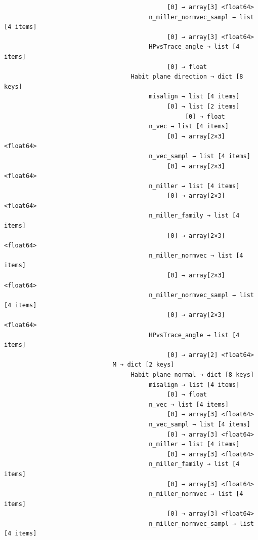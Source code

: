 \documentclass[a4paper,10pt]{article}
\begin{document}
\begin{verbatim}
                                             [0] → array[3] <float64>
                                        n_miller_normvec_sampl → list [4 items]
                                             [0] → array[3] <float64>
                                        HPvsTrace_angle → list [4 items]
                                             [0] → float
                                   Habit plane direction → dict [8 keys]
                                        misalign → list [4 items]
                                             [0] → list [2 items]
                                                  [0] → float
                                        n_vec → list [4 items]
                                             [0] → array[2×3] <float64>
                                        n_vec_sampl → list [4 items]
                                             [0] → array[2×3] <float64>
                                        n_miller → list [4 items]
                                             [0] → array[2×3] <float64>
                                        n_miller_family → list [4 items]
                                             [0] → array[2×3] <float64>
                                        n_miller_normvec → list [4 items]
                                             [0] → array[2×3] <float64>
                                        n_miller_normvec_sampl → list [4 items]
                                             [0] → array[2×3] <float64>
                                        HPvsTrace_angle → list [4 items]
                                             [0] → array[2] <float64>
                              M → dict [2 keys]
                                   Habit plane normal → dict [8 keys]
                                        misalign → list [4 items]
                                             [0] → float
                                        n_vec → list [4 items]
                                             [0] → array[3] <float64>
                                        n_vec_sampl → list [4 items]
                                             [0] → array[3] <float64>
                                        n_miller → list [4 items]
                                             [0] → array[3] <float64>
                                        n_miller_family → list [4 items]
                                             [0] → array[3] <float64>
                                        n_miller_normvec → list [4 items]
                                             [0] → array[3] <float64>
                                        n_miller_normvec_sampl → list [4 items]

\end{verbatim}
\end{document}
